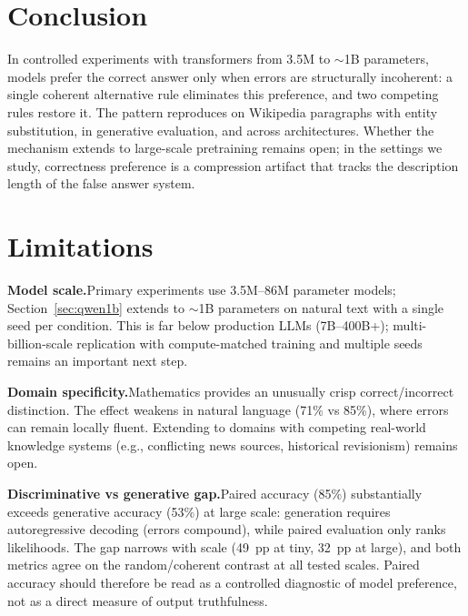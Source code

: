 \documentclass{article}
\begin{document}
\section{Conclusion}

In controlled experiments with transformers from 3.5M to ${\sim}$1B parameters, models prefer the correct answer only when errors are structurally incoherent: a single coherent alternative rule eliminates this preference, and two competing rules restore it. The pattern reproduces on Wikipedia paragraphs with entity substitution, in generative evaluation, and across architectures. Whether the mechanism extends to large-scale pretraining remains open; in the settings we study, correctness preference is a compression artifact that tracks the description length of the false answer system.

\section*{Limitations}
\label{sec:limitations}

\textbf{Model scale.}\quad Primary experiments use 3.5M--86M parameter models; Section~\ref{sec:qwen1b} extends to ${\sim}$1B parameters on natural text with a single seed per condition. This is far below production LLMs (7B--400B+); multi-billion-scale replication with compute-matched training and multiple seeds remains an important next step.

\textbf{Domain specificity.}\quad Mathematics provides an unusually crisp correct/incorrect distinction. The effect weakens in natural language (71\% vs 85\%), where errors can remain locally fluent. Extending to domains with competing real-world knowledge systems (e.g., conflicting news sources, historical revisionism) remains open.

\textbf{Discriminative vs generative gap.}\quad Paired accuracy (85\%) substantially exceeds generative accuracy (53\%) at large scale: generation requires autoregressive decoding (errors compound), while paired evaluation only ranks likelihoods. The gap narrows with scale (49~pp at tiny, 32~pp at large), and both metrics agree on the random/coherent contrast at all tested scales. Paired accuracy should therefore be read as a controlled diagnostic of model preference, not as a direct measure of output truthfulness.
\end{document}
